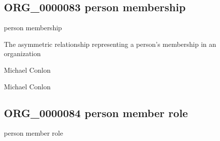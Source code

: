 \documentclass[letterpaper,10pt,english]{sphinxmanual}
\begin{document}
\subsection{ORG\_0000083 \sphinxhyphen{} person membership}
\label{\detokenize{doc-ORG_0000083:org-0000083-person-membership}}\label{\detokenize{doc-ORG_0000083:index-0}}\label{\detokenize{doc-ORG_0000083::doc}}
\begin{sphinxShadowBox}

\sphinxAtStartPar
person membership
\end{sphinxShadowBox}

\begin{sphinxShadowBox}

\sphinxAtStartPar
{\hyperref[\detokenize{doc-BFO_0000003::doc}]{}}
\end{sphinxShadowBox}

\begin{sphinxShadowBox}

\sphinxAtStartPar
The asymmetric relationship representing a person’s membership in an organization
\end{sphinxShadowBox}

\begin{sphinxShadowBox}

\sphinxAtStartPar
Michael Conlon 
\end{sphinxShadowBox}

\begin{sphinxShadowBox}

\sphinxAtStartPar
Michael Conlon 
\end{sphinxShadowBox}
\begin{quote}

\ignorespaces \end{quote}


\subsection{ORG\_0000084 \sphinxhyphen{} person member role}
\label{\detokenize{doc-ORG_0000084:org-0000084-person-member-role}}\label{\detokenize{doc-ORG_0000084:index-0}}\label{\detokenize{doc-ORG_0000084::doc}}
\begin{sphinxShadowBox}

\sphinxAtStartPar
person member role
\end{sphinxShadowBox}
\end{document}
